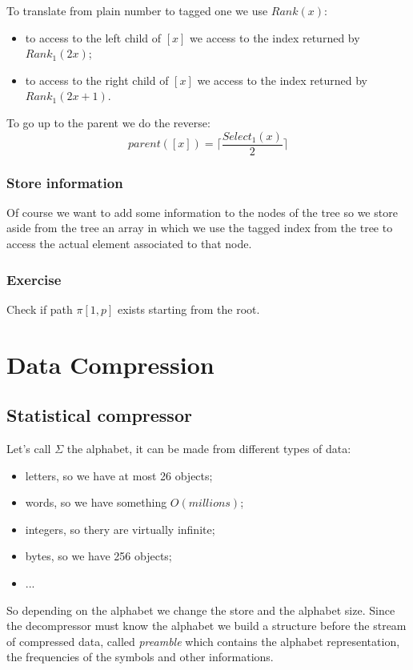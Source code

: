 To translate from plain number to tagged one we use $Rank(x)$:
\begin{itemize}
    \item to access to the left child of $[x]$ we access to the index returned by $Rank_1(2x)$;
    \item to access to the right child of $[x]$ we access to the index returned by $Rank_1(2x+1)$.
\end{itemize}

To go up to the parent we do the reverse:
$$
    parent([x]) = \lceil \frac{Select_1(x)}{2} \rceil
$$

\subsubsection{Store information}
Of course we want to add some information to the nodes of the tree so we store aside from the tree an array in which we use the tagged index from the tree to access the actual element associated to that node.

\subsubsection{Exercise}
Check if path $\pi[1, p]$ exists starting from the root.

\section{Data Compression}
\subsection{Statistical compressor}
Let's call $\Sigma$ the alphabet, it can be made from different types of data:
\begin{itemize}
    \item letters, so we have at most 26 objects;
    \item words, so we have something $O(millions)$;
    \item integers, so thery are virtually infinite;
    \item bytes, so we have 256 objects;
    \item ...
\end{itemize}

So depending on the alphabet we change the store and the alphabet size. Since the decompressor must know the alphabet we build a structure before the stream of compressed data, called \emph{preamble} which contains the alphabet representation, the frequencies of the symbols and other informations.

